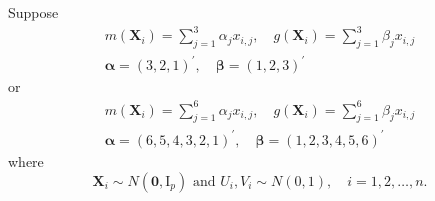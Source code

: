 \documentclass[en,12pt,mtpro2]{elegantpaper}
\begin{document}
Suppose
\begin{equation}
    \begin{array}{cc}
        m(\mathbf{X}_{i})=\sum_{j=1}^{3}\alpha_{j}x_{i,j},\quad g(\mathbf{X}_{i})=\sum_{j=1}^{3}\beta_{j}x_{i,j} \\
        \boldsymbol{\alpha}=\left(3,2,1\right)^{\prime},\quad\boldsymbol{\beta}=\left(1,2,3\right)^{\prime}
    \end{array}
    \label{eq:linear-model-1}
\end{equation}
or
\begin{equation}
    \begin{array}{cc}
        m(\mathbf{X}_{i})=\sum_{j=1}^{6}\alpha_{j}x_{i,j},\quad g(\mathbf{X}_{i})=\sum_{j=1}^{6}\beta_{j}x_{i,j} \\
        \boldsymbol{\alpha}=\left(6,5,4,3,2,1\right)^{\prime},\quad\boldsymbol{\beta}=\left(1,2,3,4,5,6\right)^{\prime}
    \end{array}
    \label{eq:linear-model-2}
\end{equation}
where
\begin{equation*}
    \mathbf{X}_{i}\sim N\left(\boldsymbol{0},\mathrm{I}_{p}\right)\text{ and }U_{i},V_{i}\sim N\left(0,1\right),\quad i=1,2,\ldots,n.
\end{equation*}
\end{document}
